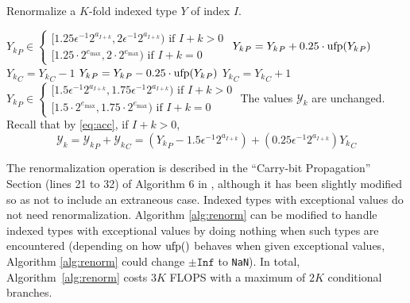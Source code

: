     \begin{samepage}
    \begin{alg}
      Renormalize a $K$-fold indexed type $Y$ of index $I$.
      \begin{algorithmic}[1]
        \Require
        \Statex ${Y_k}_P \in \begin{cases}[1.25  \epsilon^{-1} 2^{a_{I + k}}, 2  \epsilon^{-1} 2^{a_{I + k}}) \text{ if } I + k > 0 \\ [1.25 \cdot 2^{e_{\max}}, 2 \cdot 2^{e_{\max}}) \text{ if } I + k = 0\end{cases} $
              \State ${Y_k}_P = {Y_k}_P + 0.25 \cdot \text{ufp}({Y_k}_P)$
              \State ${Y_k}_C = {Y_k}_C - 1$
            \EndIf
              \State ${Y_k}_P = {Y_k}_P - 0.25 \cdot \text{ufp}({Y_k}_P)$
              \State ${Y_k}_C = {Y_k}_C + 1$
            \EndIf
          \EndFor
        \EndFunction
        \Ensure
          \Statex ${Y_k}_P \in \begin{cases}[1.5  \epsilon^{-1} 2^{a_{I + k}}, 1.75  \epsilon^{-1} 2^{a_{I + k}}) \text{ if } I + k > 0 \\ [1.5 \cdot 2^{e_{\max}}, 1.75 \cdot 2^{e_{\max}}) \text{ if } I + k = 0\end{cases} $
          \Statex The values $\mathcal{Y}_k$ are unchanged. Recall that by \eqref{eq:acc}, if $I + k > 0$,
          \begin{equation*}
            \mathcal{Y}_k = {\mathcal{Y}_k}_P + {\mathcal{Y}_k}_C = ({Y_k}_P - 1.5 \epsilon^{-1} 2^{a_{I + k}}) + (0.25\epsilon^{-1}2^{a_{I + k}}){Y_k}_C
          \end{equation*}
      \end{algorithmic}
      \label{alg:renorm}
    \end{alg}
    \end{samepage}
    The renormalization operation is described in the ``Carry-bit Propagation''
    Section (lines 21 to 32) of Algorithm $6$ in \cite{repsum}, although it has
    been slightly modified so as not to include an extraneous case. Indexed 
    types with exceptional values do not need renormalization. 
    Algorithm \ref{alg:renorm} can be modified to handle indexed 
    types with exceptional values by doing nothing when such types are
    encountered (depending on how $\text{ufp}()$ behaves when given exceptional values, Algorithm \ref{alg:renorm} could change $\pm\texttt{Inf}$ to \texttt{NaN}).
    In total, Algorithm~\ref{alg:renorm} costs $3K$ FLOPS with a maximum of
    $2K$ conditional branches.

